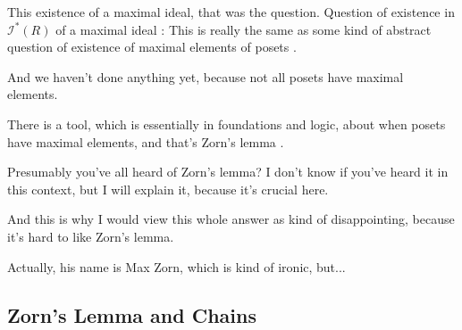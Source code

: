 \begin{content}
\begin{center}
\end{center}
\end{content}

\begin{speech}[00:34:33 - 00:36:33]
This existence of a maximal ideal, that was the question. Question of existence in $\mathscr{I}^*(R)$ of a maximal ideal : This is really the same as some kind of abstract question of existence of maximal elements of posets .

And we haven't done anything yet, because not all posets have maximal elements.

There is a tool, which is essentially in foundations and logic, about when posets have maximal elements, and that's Zorn's lemma .

Presumably you've all heard of Zorn's lemma? I don't know if you've heard it in this context, but I will explain it, because it's crucial here.

And this is why I would view this whole answer as kind of disappointing, because it's hard to like Zorn's lemma. 

Actually, his name is Max Zorn, which is kind of ironic, but... 
\end{speech}

\subsection{Zorn's Lemma and Chains}

